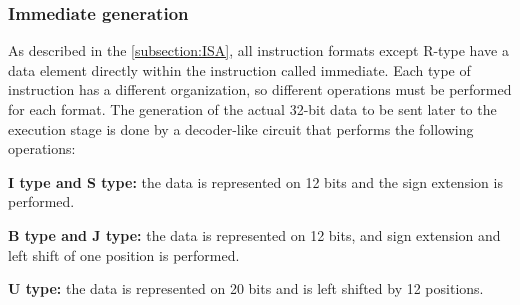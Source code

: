 \subsubsection{Immediate generation}
As described in the \autoref{subsection:ISA}, all instruction formats except R-type have a data element directly within the instruction called immediate. Each type of instruction has a different organization, so different operations must be performed for each format. The generation of the actual 32-bit data to be sent later to the execution stage is done by a decoder-like circuit that performs the following operations:
\begin{description}
    \item \textbf{I type and S type:} the data is represented on 12 bits and the sign extension is performed.
    \item \textbf{B type and J type:} the data is represented on 12 bits, and sign extension and left shift of one position is performed.
    \item \textbf{U type:} the data is represented on 20 bits and is left shifted by 12 positions.
\end{description}
